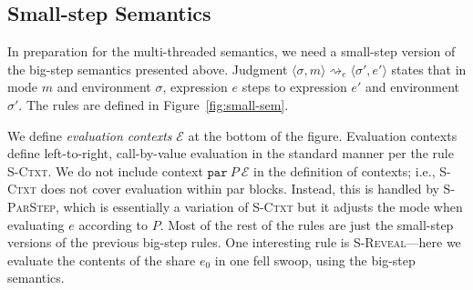 \documentclass[10pt]{article}
\newcommand{\rulelab}[1]{{\small \textsc{#1}}}
\newcommand{\kw}[1]{\ensuremath{\mathtt{#1}}}
\newcommand{\epar}[2]{\ensuremath{\kw{par}~{#1}~{#2}}}
\newcommand{\seval}[5]{\ensuremath{\config{#1}{#3} \rightsquigarrow_{#2} \config{#4}{#5}}}
\newcommand{\env}{\ensuremath{\sigma}}
\newcommand{\config}[2]{\ensuremath{\langle{#1},{#2}\rangle}}
\newcommand{\ctxt}{\ensuremath{\mathcal{E}}}
\begin{document}
\subsection{Small-step Semantics}

In preparation for the multi-threaded semantics, we need a small-step
version of the big-step semantics presented above. Judgment
$\seval{\env}{e}{m}{\env'}{e'}$ states that in mode $m$ and
environment $\env$, expression $e$ steps to expression $e'$ and
environment $\env'$. The rules are defined in
Figure~\ref{fig:small-sem}. 

We define \emph{evaluation contexts} $\ctxt$ at the bottom of the
figure. Evaluation contexts define left-to-right, 
call-by-value evaluation in the standard manner per the rule
\rulelab{S-Ctxt}. We do not include context $\epar{P}{\ctxt}$ in the
definition of contexts; i.e., \rulelab{S-Ctxt} does not cover
evaluation within par blocks. Instead, this is handled by
\rulelab{S-ParStep}, which is essentially a variation of
\rulelab{S-Ctxt} but it adjusts the mode when evaluating $e$ according
to $P$. Most of the rest of the rules are just the small-step versions
of the previous big-step rules. One interesting rule is
\rulelab{S-Reveal}---here we evaluate the contents of the share $e_0$
in one fell swoop, using the big-step semantics.
\end{document}

